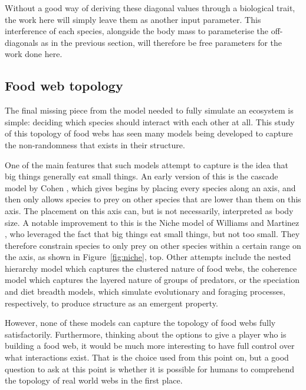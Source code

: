 Without a good way of deriving these diagonal values through a biological trait, the work here will simply leave them as another input parameter. This interference of each species, alongside the body mass to parameterise the off-diagonals as in the previous section, will therefore be free parameters for the work done here. 


\subsection{Food web topology}
\label{sec:topology}
The final missing piece from the model needed to fully simulate an ecosystem is simple: deciding which species should interact with each other at all.
This study of this topology of food webs has seen many models being developed to capture the non-randomness that exists in their structure.

One of the main features that such models attempt to capture is the idea that big things generally eat small things. An early version of this is the cascade model by Cohen \cite{Cohen2012}, which gives begins by placing every species along an axis, and then only allows species to prey on other species that are lower than them on this axis. The placement on this axis can, but is not necessarily, interpreted as body size.
A notable improvement to this is the Niche model of Williams and Martinez \cite{Williams2000}, who leveraged the fact that big things eat small things, but not too small. They therefore constrain species to only prey on other species within a certain range on the axis, as shown in Figure~\ref{fig:niche}, top.
Other attempts include the nested hierarchy model \cite{Cattin2004} which captures the clustered nature of food webs, the coherence model \cite{Johnson2014} which captures the layered nature of groups of predators, or the speciation \cite{Rossberg2006} and diet breadth \cite{Petchey2008} models, which simulate evolutionary and foraging processes, respectively, to produce structure as an emergent property. 

However, none of these models can capture the topology of food webs fully satisfactorily. Furthermore, thinking about the options to give a player who is building a food web, it would be much more interesting to have full control over what interactions exist. That is the choice used from this point on, but a good question to ask at this point is whether it is possible for humans to comprehend the topology of real world webs in the first place.

